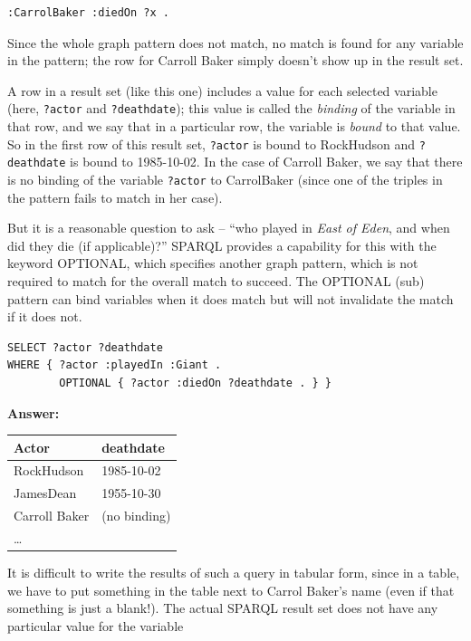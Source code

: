 \begin{lstlisting}
:CarrolBaker :diedOn ?x .
\end{lstlisting}

Since the whole graph pattern does not match, no match is found for any
variable in the pattern; the row for Carroll Baker simply doesn't show
up in the result set.

A row in a result set (like this one) includes a value for each selected
variable (here, \texttt{?actor} and \texttt{?deathdate}); this value is called the
\emph{binding} of the variable in that row, and we say that in a
particular row, the variable is \emph{bound} to that value. So in the
first row of this result set, \texttt{?actor} is bound to RockHudson and
\texttt{?deathdate} is bound to 1985-10-02. In the case of Carroll Baker, we say
that there is no binding of the variable \texttt{?actor} to CarrolBaker (since
one of the triples in the pattern fails to match in her case).

But it is a reasonable question to ask -- ``who played in \emph{East of
Eden}, and when did they die (if applicable)?'' SPARQL provides a
capability for this with the keyword OPTIONAL, which specifies another
graph pattern, which is not required to match for the overall match to
succeed. The OPTIONAL (sub) pattern can bind variables when it does
match but will not invalidate the match if it does not.


\begin{lstlisting}
SELECT ?actor ?deathdate
WHERE { ?actor :playedIn :Giant .
        OPTIONAL { ?actor :diedOn ?deathdate . } }
\end{lstlisting}

\textbf{\textbf{Answer:}}

\begin{tabular}{|ll|}
\hline
Actor&deathdate\\
\hline
RockHudson&1985-10-02\\
JamesDean&1955-10-30\\
Carroll Baker&(no binding)\\
\ldots\\
\hline
\end{tabular}


It is difficult to write the results of such a query in tabular form,
since in a table, we have to put something in the table next to Carrol
Baker's name (even if that something is just a blank!). The actual
SPARQL result set does not have any particular value for the variable

